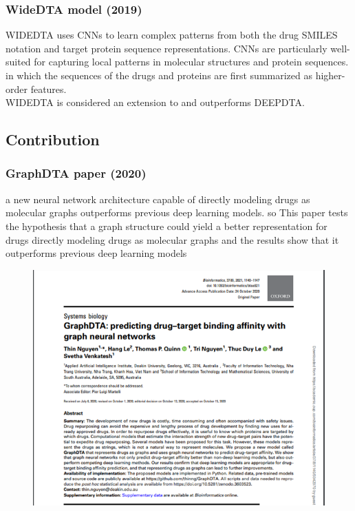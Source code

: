 \documentclass[11pt, a4paper]{article}
\begin{document}
            \subsubsection{WideDTA model (2019) \cite{10}}
                WIDEDTA uses CNNs to learn complex patterns from both the drug SMILES notation and target protein sequence representations. CNNs are particularly well-suited for capturing local patterns in molecular structures and protein sequences.
                in which the sequences of the drugs and proteins are first summarized as higher-order features.\\
                WIDEDTA is considered an extension to and outperforms DEEPDTA. 
    
    
        \subsection{Contribution}
            \subsubsection{GraphDTA paper (2020)}
            a new neural network architecture capable of directly modeling drugs as molecular graphs outperforms previous deep learning models.
            so This paper tests the hypothesis that a graph structure could yield a better representation for drugs
            directly modeling drugs as molecular graphs and the results show that it outperforms previous deep learning models
 
            \begin{figure}[H]
                \centering
                \begin{minipage}{0.45\textwidth}
                \includegraphics[width=\textwidth]{DTA overview.png}
                \end{minipage}   
            \end{figure}
            
\end{document}
